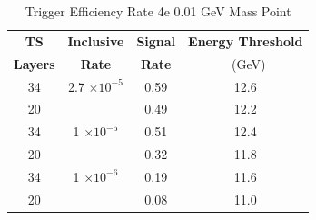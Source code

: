 \begin{table}
 \centering
\caption{Trigger Efficiency Rate 4e 0.01 GeV Mass Point}
\begin{tabular}{ c | c | c | c }
\textbf{TS} & \textbf{Inclusive} & \textbf{Signal} & \textbf{Energy Threshold}  \\ \textbf{Layers} & \textbf{Rate} & \textbf{Rate} & \ (GeV) \\ 
\hline
34 & 2.7 $\times 10^{-5}$ & 0.59 & 12.6 \\ 
20 & & 0.49 & 12.2 \\ 
\hline 
34 & 1 $\times 10^{-5}$ & 0.51 & 12.4 \\ 
20 & & 0.32 & 11.8 \\ 
\hline 
34 & 1 $\times 10^{-6}$ & 0.19 & 11.6 \\ 
20 & & 0.08 & 11.0 \\ 
\hline 
\end{tabular}
\end{table}

